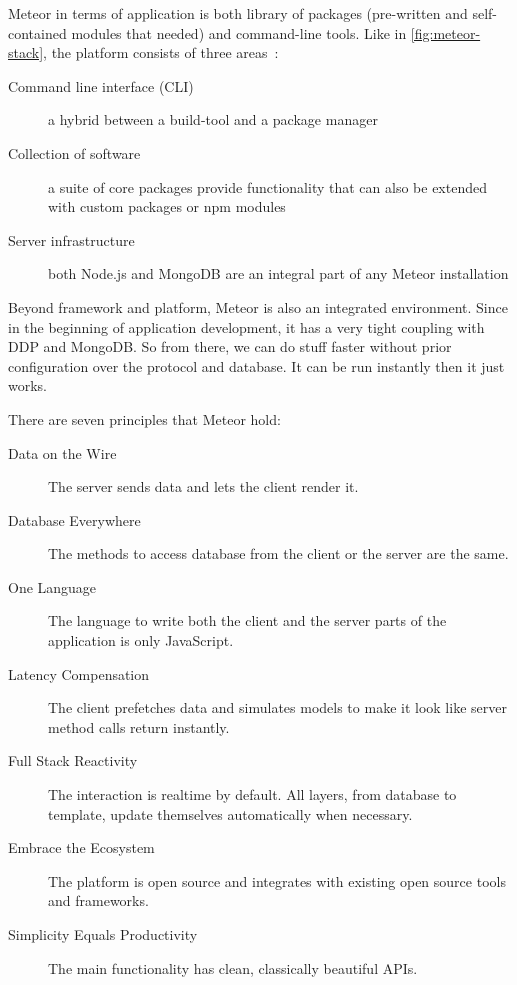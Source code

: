 Meteor in terms of application is both library of packages (pre-written and self-contained modules that needed) and command-line tools.
Like in \autoref{fig:meteor-stack}, the platform consists of three areas~\autocite{Hochhaus2014Meteor}:

\begin{description}
\item [Command line interface (CLI)] a hybrid between a build-tool and a package manager
\item [Collection of software] a suite of core packages provide functionality that can also be extended with custom packages or \ac{npm} modules
\item [Server infrastructure] both Node.js and MongoDB are an integral part of any Meteor installation
\end{description}

Beyond framework and platform, Meteor is also an integrated environment.
Since in the beginning of application development, it has a very tight coupling with \ac{DDP} and MongoDB.
So from there, we can do stuff faster without prior configuration over the protocol and database.
It can be run instantly then it just works.

\noindent There are seven principles that Meteor hold:

\begin{description}
\item [Data on the Wire] The server sends data and lets the client render it.
\item [Database Everywhere] The methods to access database from the client or the server are the same.
\item [One Language] The language to write both the client and the server parts of the application is only JavaScript.
\item [Latency Compensation] The client prefetches data and simulates models to make it look like server method calls return instantly.
\item [Full Stack Reactivity] The interaction is realtime by default. All layers, from database to template, update themselves automatically when necessary.
\item [Embrace the Ecosystem] The platform is open source and integrates with existing open source tools and frameworks.
\item [Simplicity Equals Productivity]  The main functionality has clean, classically beautiful APIs.
\end{description}

